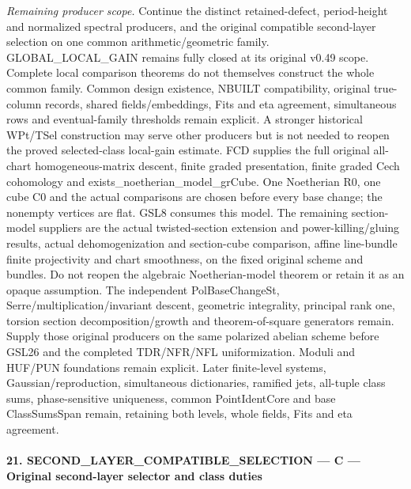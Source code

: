 \emph{Remaining producer scope.} Continue the distinct retained-defect, period-height and normalized spectral producers, and the original compatible second-layer selection on one common arithmetic/geometric family. GLOBAL\_\allowbreak LOCAL\_\allowbreak GAIN remains fully closed at its original v0.49 scope. Complete local comparison theorems do not themselves construct the whole common family. Common design existence, NBUILT compatibility, original true-column records, shared fields/embeddings, Fits and eta agreement, simultaneous rows and eventual-family thresholds remain explicit. A stronger historical WPt/TSel construction may serve other producers but is not needed to reopen the proved selected-class local-gain estimate. FCD supplies the full original all-chart homogeneous-matrix descent, finite graded presentation, finite graded Cech cohomology and exists\_\allowbreak noetherian\_\allowbreak model\_\allowbreak grCube. One Noetherian R0, one cube C0 and the actual comparisons are chosen before every base change; the nonempty vertices are flat. GSL8 consumes this model. The remaining section-model suppliers are the actual twisted-section extension and power-killing/gluing results, actual dehomogenization and section-cube comparison, affine line-bundle finite projectivity and chart smoothness, on the fixed original scheme and bundles. Do not reopen the algebraic Noetherian-model theorem or retain it as an opaque assumption. The independent PolBaseChangeSt, Serre/multiplication/invariant descent, geometric integrality, principal rank one, torsion section decomposition/growth and theorem-of-square generators remain. Supply those original producers on the same polarized abelian scheme before GSL26 and the completed TDR/NFR/NFL uniformization. Moduli and HUF/PUN foundations remain explicit. Later finite-level systems, Gaussian/reproduction, simultaneous dictionaries, ramified jets, all-tuple class sums, phase-sensitive uniqueness, common PointIdentCore and base ClassSumsSpan remain, retaining both levels, whole fields, Fits and eta agreement.



\paragraph{21. SECOND\_\allowbreak LAYER\_\allowbreak COMPATIBLE\_\allowbreak SELECTION — C — Original second-layer selector and class duties}

